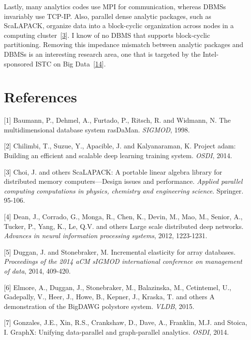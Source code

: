\documentclass[b5paper,11pt,twoside,openright]{book}
\begin{document}
Lastly, many analytics codes use MPI for communication, whereas DBMSs
invariably use TCP-IP. Also, parallel dense analytic packages, such as
ScaLAPACK, organize data into a block-cyclic organization across nodes
in a computing cluster~{{[}\protect\hyperlink{ref-scalapack}{3}{]}}. I
know of no DBMS that supports block-cyclic partitioning. Removing this
impedance mismatch between analytic packages and DBMSs is an interesting
research area, one that is targeted by the Intel-sponsored ISTC on Big
Data~{{[}\protect\hyperlink{ref-istc-bigdata}{14}{]}}.

\section*{References}

\leavevmode\hypertarget{ref-rasdaman}{}%
{[}1{]} Baumann, P., Dehmel, A., Furtado, P., Ritsch, R. and Widmann, N.
The multidimensional database system rasDaMan. \emph{SIGMOD}, 1998.

\leavevmode\hypertarget{ref-projectadam}{}%
{[}2{]} Chilimbi, T., Suzue, Y., Apacible, J. and Kalyanaraman, K.
Project adam: Building an efficient and scalable deep learning training
system. \emph{OSDI}, 2014.

\leavevmode\hypertarget{ref-scalapack}{}%
{[}3{]} Choi, J. and others ScaLAPACK: A portable linear algebra library
for distributed memory computers---Design issues and performance.
\emph{Applied parallel computing computations in physics, chemistry and
  engineering science}. Springer. 95-106.

\leavevmode\hypertarget{ref-dean2012large}{}%
{[}4{]} Dean, J., Corrado, G., Monga, R., Chen, K., Devin, M., Mao, M.,
Senior, A., Tucker, P., Yang, K., Le, Q.V. and others Large scale
distributed deep networks. \emph{Advances in neural information
  processing systems}, 2012, 1223-1231.

\leavevmode\hypertarget{ref-duggan-array}{}%
{[}5{]} Duggan, J. and Stonebraker, M. Incremental elasticity for array
databases. \emph{Proceedings of the 2014 aCM sIGMOD international
  conference on management of data}, 2014, 409-420.

\leavevmode\hypertarget{ref-bigdawg}{}%
{[}6{]} Elmore, A., Duggan, J., Stonebraker, M., Balazinska, M.,
Cetintemel, U., Gadepally, V., Heer, J., Howe, B., Kepner, J., Kraska,
T. and others A demonstration of the BigDAWG polystore system.
\emph{VLDB}, 2015.

\leavevmode\hypertarget{ref-graphx}{}%
{[}7{]} Gonzales, J.E., Xin, R.S., Crankshaw, D., Dave, A., Franklin,
M.J. and Stoica, I. GraphX: Unifying data-parallel and graph-parallel
analytics. \emph{OSDI}, 2014.
\end{document}
